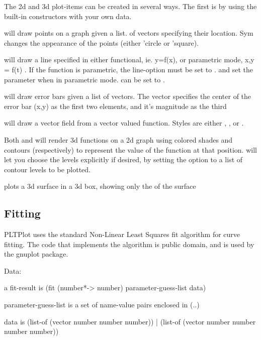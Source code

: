 \documentclass{article}
\begin{document}
{The 2d and 3d plot-items can be created in several ways. The first is by using the built-in constructors with your own data. 


 will draw points on a graph given a list. of vectors specifying their location. Sym changes the appearance of the points (either 'circle or 'square).


 will draw a line specified in either functional, ie. y=f(x), or  parametric mode, x,y = f(t) . If the function is parametric, the line-option  must be set to .  and  set the parameter when in parametric mode.  can be set to .


 will draw error bars given a list of vectors. The vector specifies the  center of the error bar (x,y) as the first two elements, and it's magnitude as the third


 will draw a vector field from a vector valued function. Styles are either , , or . 


Both  and  will render 3d functions on a 2d graph using colored shades and contours (respectively) to represent the value of the function at that position.  will let you choose the levels explicitly if desired, by setting the  option to a list of contour levels to be plotted.

 plots a 3d surface in a 3d box, showing only the  of the surface

\subsection{Fitting}
\label{Fitting}


PLTPlot uses the standard Non-Linear Least Squares fit algorithm for curve fitting. The code that implements the algorithm is public domain, and is used by the gnuplot package.



\begin{schemedisplay}

Data:

a fit-result is
  (fit (number*-> number) parameter-guess-list  data)


parameter-guess-list is a set of name-value pairs enclosed in (..)

data is
  (list-of (vector number number number))
| (list-of (vector number number number number))


\end{schemedisplay}}
\end{document}
